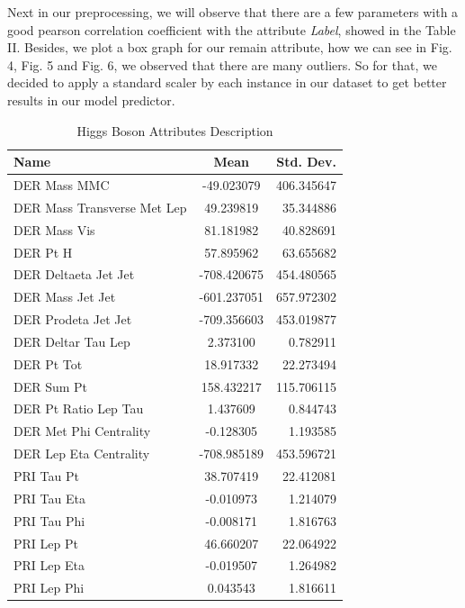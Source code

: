 \documentclass[conference]{IEEEtran}
\begin{document}
Next in our preprocessing, we will observe that there are a few parameters with a good pearson correlation coefficient with the attribute \textit{Label}, showed in the Table II. Besides, we plot a box graph for our remain attribute, how we can see in Fig. 4, Fig. 5 and Fig. 6, we observed that there are many outliers. So for that, we decided to apply a standard scaler by each instance in our dataset to get better results in our model predictor.

\begin{table}[h!]
  \begin{center}
    \caption{Higgs Boson Attributes Description}
    \label{tab:table1}
    \begin{tabular}{l|S|r}
      \textbf{Name} & \textbf{Mean} & \textbf{Std. Dev.}\\
      \hline
      DER Mass MMC & -49.023079 & 406.345647\\
      DER Mass Transverse Met Lep & 49.239819 & 35.344886\\
      DER Mass Vis & 81.181982 & 40.828691\\ 
      DER Pt H & 57.895962 & 63.655682\\ 
      DER Deltaeta Jet Jet & -708.420675 & 454.480565\\ 
      DER Mass Jet Jet & -601.237051 & 657.972302\\ 
      DER Prodeta Jet Jet & -709.356603 & 453.019877\\ 
      DER Deltar Tau Lep & 2.373100 & 0.782911\\ 
      DER Pt Tot & 18.917332 & 22.273494\\ 
      DER Sum Pt & 158.432217 & 115.706115\\ 
      DER Pt Ratio Lep Tau & 1.437609 & 0.844743\\ 
      DER Met Phi Centrality & -0.128305 & 1.193585\\ 
      DER Lep Eta Centrality & -708.985189 & 453.596721\\ 
      PRI Tau Pt & 38.707419 & 22.412081\\
      PRI Tau Eta & -0.010973 & 1.214079\\
      PRI Tau Phi & -0.008171 & 1.816763\\
      PRI Lep Pt & 46.660207 & 22.064922\\
      PRI Lep Eta & -0.019507 & 1.264982\\
      PRI Lep Phi & 0.043543 & 1.816611\\

\end{tabular}
\end{center}
\end{table}
\end{document}
